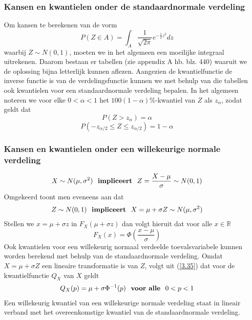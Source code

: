 \documentclass[titlepage]{article}
\numberwithin{equation}{section}
\begin{document}
\subsubsection{Kansen en kwantielen onder de standaardnormale verdeling}
Om kansen te berekenen van de vorm
\begin{equation*}
	P(Z \in A) = \int_A \frac{1}{\sqrt{2\pi}} e^{-\frac{1}{2}z^2} dz
\end{equation*}
waarbij $Z \sim N(0,1)$, moeten we in het algemeen een moeilijke integraal uitrekenen. Daarom bestaan er tabellen (zie appendix A hb. blz. 440) waaruit we de oplossing bijna letterlijk kunnen aflezen.\newline\newline
Aangezien de kwantielfunctie de inverse functie is van de verdelingsfunctie kunnen we met behulp van die tabellen ook kwantielen voor een standaardnormale verdeling bepalen.\newline
In het algemeen noteren we voor elke $0<\alpha<1$ het $100(1-\alpha)\%$-kwantiel van $Z$ als $z_\alpha$, zodat geldt dat
\begin{equation}
	P(Z>z_\alpha) = \alpha
	\label{4.15}
\end{equation}
\begin{equation}
	P(-z_{\alpha/2}\leq Z\leq z_{\alpha/2}) = 1-\alpha
	\label{4.16}
\end{equation}
\subsubsection{Kansen en kwantielen onder een willekeurige normale verdeling}
\begin{equation}
	X \sim N(\mu, \sigma^2) \text{ \textbf{ impliceert } } Z= \frac{X-\mu}{\sigma} \sim N(0, 1)
	\label{4.19}
\end{equation}
Omgekeerd toont men eveneens aan dat
\begin{equation}
	Z\sim N(0,1) \text{ \textbf{ impliceert } } X=\mu + \sigma Z \sim N(\mu , \sigma^2)
	\label{4.20}
\end{equation}
Stellen we $x=\mu + \sigma z$ in $F_X(\mu + \sigma z)$ dan volgt hieruit dat voor alle $x\in  \mathbb{R}$
\begin{equation*}
	F_X(x) = \Phi \left(\frac{x-\mu}{\sigma}\right)
\end{equation*}
Ook kwantielen voor een willekeurig normaal verdeelde toevalsvariabele kunnen worden berekend met behulp van de standaardnormale verdeling. Omdat $X = \mu + \sigma Z$ een lineaire transformatie is van $Z$, volgt uit (\ref{3.35}) dat voor de kwantielfunctie $Q_X$ van $X$ geldt
\begin{equation}
	Q_X(p) = \mu + \sigma \Phi ^{-1}(p) \text{ \textbf{ voor alle } } 0<p<1
	\label{4.21}
\end{equation}
Een willekeurig kwantiel van een willekeurige normale verdeling staat in lineair verband met het overeenkomstige kwantiel van de standaardnormale verdeling.
\end{document}
